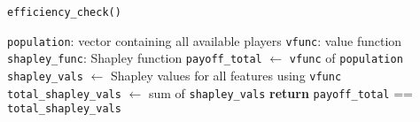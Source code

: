 {\begin{enumerate}[a)]
\begin{enumerate}[(i)]
	\begin{algorithm}[H]
		\caption{\texttt{efficiency\_check()}}
		\begin{algorithmic}[1]
			\Require \texttt{population}: vector containing all available players
			\Require \texttt{vfunc}: value function
			\Require \texttt{shapley\_func}: Shapley function
			\State \texttt{payoff\_total} $\gets$ \texttt{vfunc} of \texttt{population}
			\State \texttt{shapley\_vals} $\gets$ Shapley values for all features using \texttt{vfunc}
			\State \texttt{total\_shapley\_vals} $\gets$ sum of \texttt{shapley\_vals}
			\State \textbf{return} \texttt{payoff\_total} == \texttt{total\_shapley\_vals}
		\end{algorithmic}
	\end{algorithm}
	\end{enumerate}
\end{enumerate}


}
